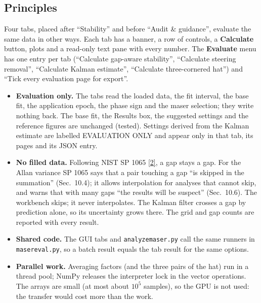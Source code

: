 \documentclass[11pt,a4paper]{article}
\newcommand{\nist}{\href{https://tf.nist.gov/general/pdf/2220.pdf}{[2]}}
\renewcommand{\_}{\usscore\allowbreak}
\begin{document}
\subsection{Principles}
Four tabs, placed after ``Stability'' and before ``Audit \& guidance'', evaluate the same data in
other ways. Each tab has a banner, a row of controls, a \textbf{Calculate} button, plots and a
read-only text pane with every number. The \textbf{Evaluate} menu has one entry per tab (``Calculate
gap-aware stability'', ``Calculate steering removal'', ``Calculate Kalman estimate'', ``Calculate
three-cornered hat'') and ``Tick every evaluation page for export''.
\begin{itemize}
\item \textbf{Evaluation only.} The tabs read the loaded data, the fit interval, the base fit, the
application epoch, the phase sign and the maser selection; they write nothing back. The base fit, the
Results box, the suggested settings and the reference figures are unchanged (tested). Settings derived
from the Kalman estimate are labelled EVALUATION ONLY and appear only in that tab, its pages and its
JSON entry.
\item \textbf{No filled data.} Following NIST SP 1065 \nist, a gap stays a gap. For the Allan
variance SP 1065 says that a pair touching a gap ``is skipped in the summation'' (Sec.~10.4); it
allows interpolation for analyses that cannot skip, and warns that with many gaps ``the results will be
suspect'' (Sec.~10.6). The workbench skips; it never interpolates. The Kalman filter crosses a gap by
prediction alone, so its uncertainty grows there. The grid and gap counts are reported with every
result.
\item \textbf{Shared code.} The GUI tabs and \texttt{analyze\_maser.py} call the same runners in
\texttt{maser\_eval.py}, so a batch result equals the tab result for the same options.
\item \textbf{Parallel work.} Averaging factors (and the three pairs of the hat) run in a thread pool;
NumPy releases the interpreter lock in the vector operations. The arrays are small (at most about
\(10^5\) samples), so the GPU is not used: the transfer would cost more than the work.
\end{itemize}
\end{document}
